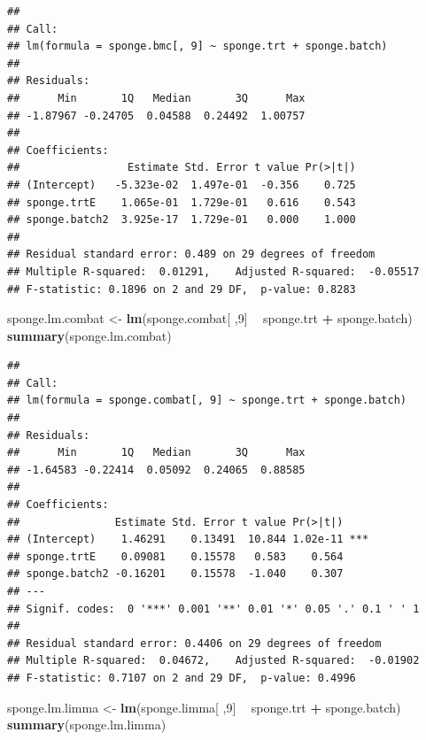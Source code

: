\documentclass[]{book}
\newenvironment{Shaded}{\begin{snugshade}}{\end{snugshade}}
\newcommand{\KeywordTok}[1]{\textcolor[rgb]{0.13,0.29,0.53}{\textbf{#1}}}
\newcommand{\DecValTok}[1]{\textcolor[rgb]{0.00,0.00,0.81}{#1}}
\newcommand{\StringTok}[1]{\textcolor[rgb]{0.31,0.60,0.02}{#1}}
\newcommand{\OperatorTok}[1]{\textcolor[rgb]{0.81,0.36,0.00}{\textbf{#1}}}
\newcommand{\NormalTok}[1]{#1}
\begin{document}
\begin{verbatim}
## 
## Call:
## lm(formula = sponge.bmc[, 9] ~ sponge.trt + sponge.batch)
## 
## Residuals:
##      Min       1Q   Median       3Q      Max 
## -1.87967 -0.24705  0.04588  0.24492  1.00757 
## 
## Coefficients:
##                 Estimate Std. Error t value Pr(>|t|)
## (Intercept)   -5.323e-02  1.497e-01  -0.356    0.725
## sponge.trtE    1.065e-01  1.729e-01   0.616    0.543
## sponge.batch2  3.925e-17  1.729e-01   0.000    1.000
## 
## Residual standard error: 0.489 on 29 degrees of freedom
## Multiple R-squared:  0.01291,    Adjusted R-squared:  -0.05517 
## F-statistic: 0.1896 on 2 and 29 DF,  p-value: 0.8283
\end{verbatim}

\begin{Shaded}
\begin{Highlighting}[]
\NormalTok{sponge.lm.combat <-}\StringTok{ }\KeywordTok{lm}\NormalTok{(sponge.combat[ ,}\DecValTok{9}\NormalTok{] }\OperatorTok{~}\StringTok{ }\NormalTok{sponge.trt }\OperatorTok{+}\StringTok{ }\NormalTok{sponge.batch)}
\KeywordTok{summary}\NormalTok{(sponge.lm.combat)}
\end{Highlighting}
\end{Shaded}

\begin{verbatim}
## 
## Call:
## lm(formula = sponge.combat[, 9] ~ sponge.trt + sponge.batch)
## 
## Residuals:
##      Min       1Q   Median       3Q      Max 
## -1.64583 -0.22414  0.05092  0.24065  0.88585 
## 
## Coefficients:
##               Estimate Std. Error t value Pr(>|t|)    
## (Intercept)    1.46291    0.13491  10.844 1.02e-11 ***
## sponge.trtE    0.09081    0.15578   0.583    0.564    
## sponge.batch2 -0.16201    0.15578  -1.040    0.307    
## ---
## Signif. codes:  0 '***' 0.001 '**' 0.01 '*' 0.05 '.' 0.1 ' ' 1
## 
## Residual standard error: 0.4406 on 29 degrees of freedom
## Multiple R-squared:  0.04672,    Adjusted R-squared:  -0.01902 
## F-statistic: 0.7107 on 2 and 29 DF,  p-value: 0.4996
\end{verbatim}

\begin{Shaded}
\begin{Highlighting}[]
\NormalTok{sponge.lm.limma <-}\StringTok{ }\KeywordTok{lm}\NormalTok{(sponge.limma[ ,}\DecValTok{9}\NormalTok{] }\OperatorTok{~}\StringTok{ }\NormalTok{sponge.trt }\OperatorTok{+}\StringTok{ }\NormalTok{sponge.batch)}
\KeywordTok{summary}\NormalTok{(sponge.lm.limma)}
\end{Highlighting}
\end{Shaded}
\end{document}
